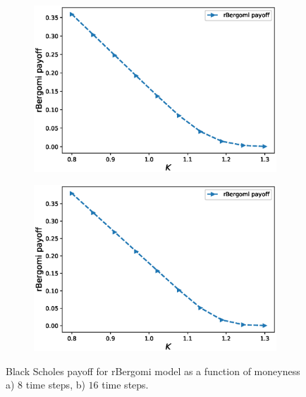 \documentclass[11pt]{article}
\begin{document}
\begin{figure}[!h]
	\centering
	\begin{subfigure}{.5\textwidth}
		\centering
		\includegraphics[width=0.95\linewidth]{./figures/payoff_plots_H_007/rBergomi_payoff_8steps_wrt_monyeness}
		\caption{}
		\label{fig:rBergomi_payoff_4steps_wrt_monyeness_sub3}
	\end{subfigure}%
	\begin{subfigure}{.5\textwidth}
		\centering
		\includegraphics[width=0.95\linewidth]{./figures/payoff_plots_H_007/rBergomi_payoff_16steps_wrt_monyeness}
		\caption{ }
		\label{fig:rBergomi_payoff_4steps_wrt_monyeness_sub4}
	\end{subfigure}%
	\caption{Black Scholes payoff for rBergomi model as a function of moneyness a) $8$  time steps, b) $16$  time steps.}
	\label{fig:rBergomi_payoff_4steps_wrt_monyeness_2}
\end{figure}
\end{document}
